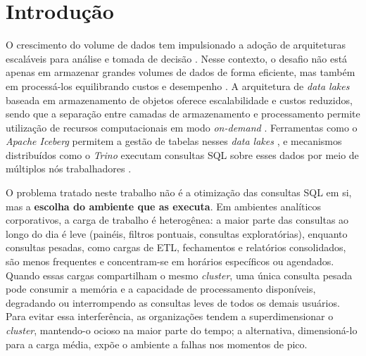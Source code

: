 \FloatBarrier
\section{Introdução}
\label{sec:introducao}

O crescimento do volume de dados tem impulsionado a adoção de arquiteturas escaláveis para análise e tomada de decisão \cite{ibmbigdata}. Nesse contexto, o desafio não está apenas em armazenar grandes volumes de dados de forma eficiente, mas também em processá-los equilibrando custos e desempenho \cite{weintraub2024}. A arquitetura de \textit{data lakes} baseada em armazenamento de objetos oferece escalabilidade e custos reduzidos, sendo que a separação entre camadas de armazenamento e processamento permite utilização de recursos computacionais em modo \textit{on-demand} \cite{dremiodatalake,weintraub2024}. Ferramentas como o \textit{Apache Iceberg} permitem a gestão de tabelas nesses \textit{data lakes} \cite{iceberg2024}, e mecanismos distribuídos como o \textit{Trino} executam consultas SQL sobre esses dados por meio de múltiplos nós trabalhadores \cite{trinoconcepts}.

O problema tratado neste trabalho não é a otimização das consultas SQL em si, mas a \textbf{escolha do ambiente que as executa}. Em ambientes analíticos corporativos, a carga de trabalho é heterogênea: a maior parte das consultas ao longo do dia é leve (painéis, filtros pontuais, consultas exploratórias), enquanto consultas pesadas, como cargas de ETL, fechamentos e relatórios consolidados, são menos frequentes e concentram-se em horários específicos ou agendados. Quando essas cargas compartilham o mesmo \textit{cluster}, uma única consulta pesada pode consumir a memória e a capacidade de processamento disponíveis, degradando ou interrompendo as consultas leves de todos os demais usuários. Para evitar essa interferência, as organizações tendem a superdimensionar o \textit{cluster}, mantendo-o ocioso na maior parte do tempo; a alternativa, dimensioná-lo para a carga média, expõe o ambiente a falhas nos momentos de pico.

